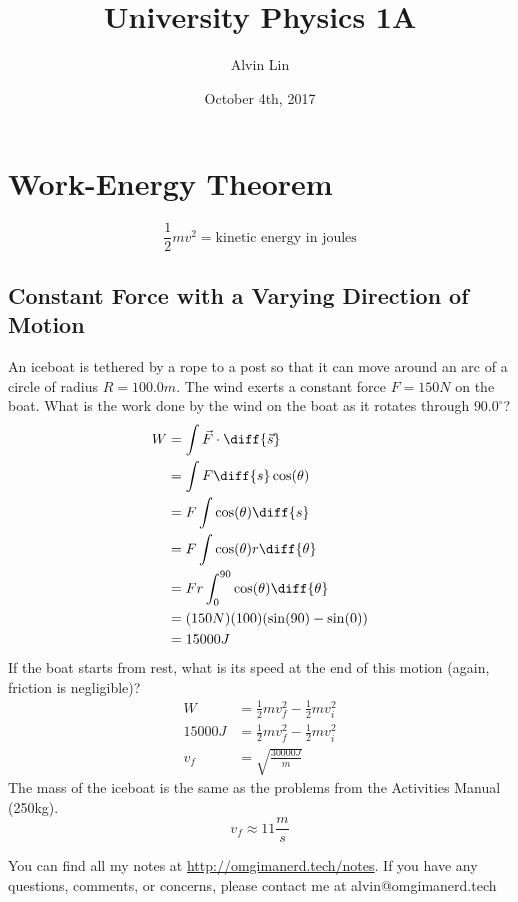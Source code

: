 \documentclass[letterpaper, 12pt]{math}
\title{University Physics 1A}
\author{Alvin Lin}
\date{October 4th, 2017}
\begin{document}
\maketitle

\section*{Work-Energy Theorem}
\[ \frac{1}{2}mv^2 = \text{kinetic energy in joules} \]

\subsection*{Constant Force with a Varying Direction of Motion}
An iceboat is tethered by a rope to a post so that it can move around an arc of
a circle of radius \( R = 100.0m \). The wind exerts a constant force \( F =
150N \) on the boat. What is the work done by the wind on the boat as it rotates
through \( 90.0^{\circ} \)?
\begin{align*}
  W &= \int\vec{F}\cdot\diff{\vec{s}} \\
  &= \int F\diff{s}\cos(\theta) \\
  &= F\int\cos(\theta)\diff{s} \\
  &= F\int\cos(\theta)r\diff{\theta} \\
  &= Fr\int_{0}^{90}\cos(\theta)\diff{\theta} \\
  &= (150N)(100)(\sin(90)-\sin(0)) \\
  &= 15000J
\end{align*}
If the boat starts from rest, what is its speed at the end of this motion
(again, friction is negligible)?
\begin{align*}
  W &= \frac{1}{2}mv_f^2-\frac{1}{2}mv_i^2 \\
  15000J &= \frac{1}{2}mv_f^2-\frac{1}{2}mv_i^2 \\
  v_f &= \sqrt{\frac{30000J}{m}}
\end{align*}
The mass of the iceboat is the same as the problems from the Activities Manual
(250kg).
\[ v_f \approx 11\frac{m}{s} \]

\begin{center}
  You can find all my notes at \url{http://omgimanerd.tech/notes}. If you have
  any questions, comments, or concerns, please contact me at
  alvin@omgimanerd.tech
\end{center}
\end{document}
